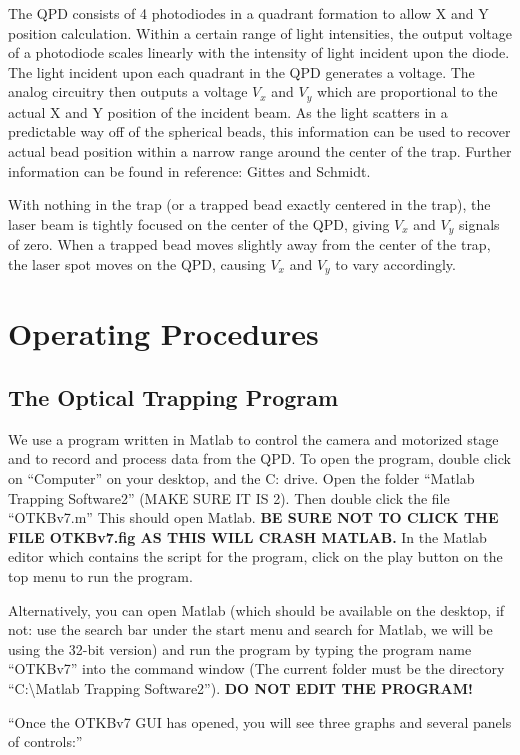 \documentclass{../lab}
\begin{document}
The QPD consists of 4 photodiodes in a quadrant formation to allow X and Y position calculation. Within a certain range of light intensities, the output voltage of a photodiode scales linearly with the intensity of light incident upon the diode. The light incident upon each quadrant in the QPD generates a voltage. The analog circuitry then outputs a voltage $V_x$ and $V_y$ which are proportional to the actual X and Y position of the incident beam. As the light scatters in a predictable way off of the spherical beads, this information can be used to recover actual bead position within a narrow range around the center of the trap. Further information can be found in reference: Gittes and Schmidt.

With nothing in the trap (or a trapped bead exactly centered in the trap), the laser beam is tightly focused on the center of the QPD, giving $V_x$ and $V_y$ signals of zero. When a trapped bead moves slightly away from the center of the trap, the laser spot moves on the QPD, causing $V_x$ and $V_y$ to vary accordingly.

\section{Operating Procedures}

\subsection{The Optical Trapping Program}

We use a program written in Matlab to control the camera and motorized stage and to record and process data from the QPD. To open the program, double click on ``Computer'' on your desktop, and the C: drive. Open the folder ``Matlab Trapping Software2'' (MAKE SURE IT IS 2). Then double click the file ``OTKBv7.m'' This should open Matlab. \textbf{BE SURE NOT TO CLICK THE FILE OTKBv7.fig AS THIS WILL CRASH MATLAB.} In the Matlab editor which contains the script for the program, click on the play button on the top menu to run the program.

Alternatively, you can open Matlab (which should be available on the desktop, if not: use the search bar under the start menu and search for Matlab, we will be using the 32-bit version) and run the program by typing the program name ``OTKBv7'' into the command window (The current folder must be the directory ``C:\textbackslash Matlab Trapping Software2''). \textbf{DO NOT EDIT THE PROGRAM!}

``Once the OTKBv7 GUI has opened, you will see three graphs and several panels of controls:''
\end{document}
